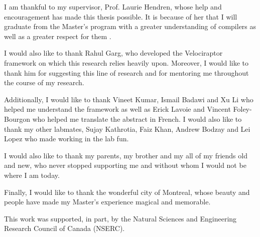 I am thankful to my supervisor, Prof. Laurie Hendren, whose help and encouragement has made this thesis possible. It is because of her that I will graduate from the Master's program with a greater understanding  of compilers as well as a greater respect for them . 

I would also like to thank Rahul Garg, who developed the Velociraptor framework on which this research relies heavily upon. Moreover, I would like to thank him for suggesting this line of research and for mentoring me throughout the course of my research. 

Additionally, I would like to thank Vineet Kumar, Ismail Badawi and Xu Li who helped me understand the \mclab framework as well as Erick Lavoie and Vincent Foley-Bourgon who helped me translate the abstract in French. I would also like to thank my other labmates, Sujay Kathrotia, Faiz Khan, Andrew Bodzay and Lei Lopez who made working in the lab fun. 

I would also like to thank my parents, my brother and my all of my friends old and new, who never stopped supporting me and without whom I would not be where I am today.

Finally, I would like to thank the wonderful city of Montreal, whose beauty and people have made my Master's experience magical and memorable. 

This work was supported, in part, by the Natural Sciences and Engineering Research
Council of Canada (NSERC).
